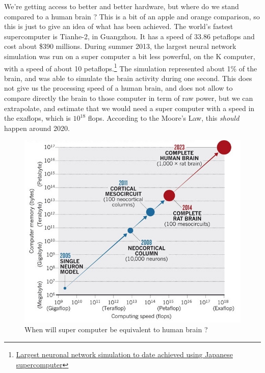 \documentclass[12pt]{article}
\begin{document}
We're getting access to better and better hardware, but where do we stand
compared to a human brain ? This is a bit of an apple and orange comparison, so
this is just to give an idea of what has been achieved. The world's fastest
supercomputer is Tianhe-2, in Guangzhou. It has a speed of 33.86 \gls{petaflops}
and cost about \$390 millions. During summer 2013, the largest neural network
simulation was run on a super computer a bit less powerful, on the K computer,
with a speed of about 10 petaflops.\footnote{\href{http://www.sciencedaily.com/releases/2013/08/130802080237.htm}
{Largest neuronal network simulation to date achieved using Japanese
supercomputer}} The simulation represented about 1\% of the brain, and was able
to simulate the brain activity during one second. This does not give us the
processing speed of a human brain, and does not allow to compare directly the
brain to those computer in term of raw power, but we can extrapolate, and
estimate that we would need a super computer with a speed in the exaflops, which
is $10^{18}$ flops. According to the Moore's Law, this {\em should} happen around
2020.\\

\begin{figure}[ht]
    \centering
    \includegraphics[width=\textwidth]{fartogo}
    \caption{When will super computer be equivalent to human brain ?}
    \label{fig:fartogo}
\end{figure}

\end{document}

